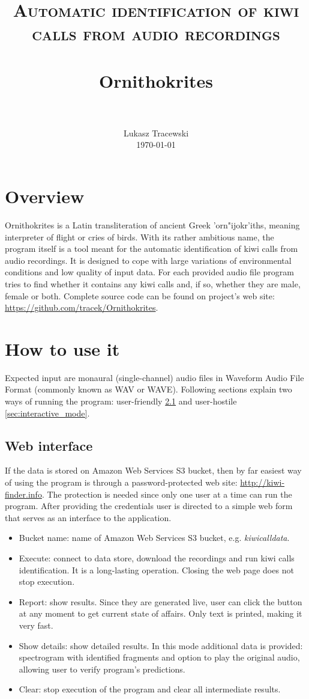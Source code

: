 \documentclass[paper=a4, fontsize=11pt]{scrartcl}	%
\title{
		\usefont{OT1}{bch}{b}{n}
		\normalfont \normalsize \textsc{Automatic identification of kiwi calls from audio recordings} \\ [25pt]
		\horrule{0.5pt} \\[0.4cm]
		\huge Ornithokrites \\
		\horrule{2pt} \\[0.5cm]
}
\author{
		\normalfont 								\normalsize
        Lukasz Tracewski\\[-3pt]		\normalsize
        \today
}
\date{}
\numberwithin{equation}{section}		%
\numberwithin{figure}{section}			%
\numberwithin{table}{section}				%
\begin{document}
\maketitle
\section{Overview}
Ornithokrites is a Latin transliteration of ancient Greek {'orn"ijokr'iths}, meaning interpreter of flight or cries of birds. With its rather ambitious name, the program itself is a tool meant for the automatic identification of kiwi calls from audio recordings. It is designed to cope with large variations of environmental conditions and low quality of input data. For each provided audio file program tries to find whether it contains any kiwi calls and, if so, whether they are male, female or both. \newline
Complete source code can be found on project's web site: \url{https://github.com/tracek/Ornithokrites}.

\section{How to use it}
Expected input are monaural (single-channel) audio files in Waveform Audio File Format (commonly known as WAV or WAVE). Following sections explain two ways of running the program: user-friendly \ref{sec:web_interface} and user-hostile \ref{sec:interactive_mode}.
\subsection{Web interface}
\label{sec:web_interface}
If the data is stored on Amazon Web Services S3 bucket, then by far easiest way of using the program is through a password-protected web site: \url{http://kiwi-finder.info}. The protection is needed since only one user at a time can run the program. \newline
After providing the credentials user is directed to a simple web form that serves as an interface to the application. 
\begin{itemize}
	\item Bucket name: name of Amazon Web Services S3 bucket, e.g. \textit{kiwicalldata}.
	\item Execute: connect to data store, download the recordings and run kiwi calls identification. It is a long-lasting operation. Closing the web page does not stop execution.
	\item Report: show results. Since they are generated live, user can click the button at any moment to get current state of affairs. Only text is printed, making it very fast.
	\item Show details: show detailed results. In this mode additional data is provided: spectrogram with identified fragments and option to play the original audio, allowing user to verify program's predictions.
	\item Clear: stop execution of the program and clear all intermediate results.
\end{itemize}
\end{document}
